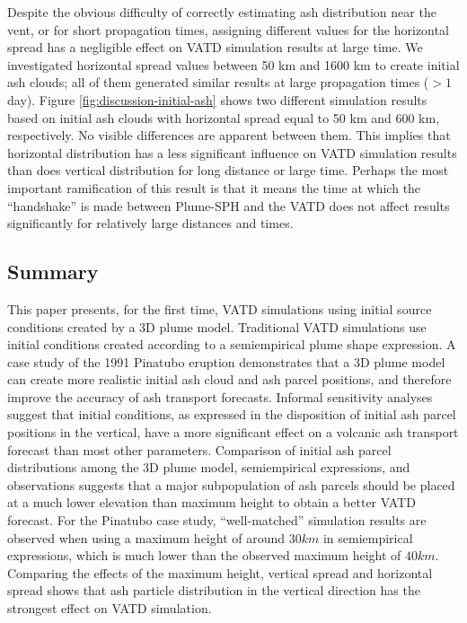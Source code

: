 \documentclass[utf8]{frontiersSCNS} %
\begin{document}
Despite the obvious difficulty of correctly estimating ash distribution near the vent, or for short propagation times, assigning different values for the horizontal spread has a negligible effect on VATD simulation results at large time. We investigated horizontal spread values between 50 km and 1600 km to create initial ash clouds; all of them generated similar results at large propagation times ($> 1$ day). Figure \ref{fig:discussion-initial-ash} shows two different simulation results based on initial ash clouds with horizontal spread equal to 50 km and 600 km, respectively. No visible differences are apparent between them. This implies that horizontal distribution has a less significant influence on VATD simulation results than does vertical distribution for long distance or large time.  Perhaps the most important ramification of this result is that it means the time at which the ``handshake'' is made between Plume-SPH and the VATD does not affect results significantly for relatively large distances and times.

\subsection{Summary}

This paper presents, for the first time, VATD simulations using initial source conditions created by a 3D plume model. Traditional VATD simulations use initial conditions created according to a semiempirical plume shape expression. A case study of the 1991 Pinatubo eruption demonstrates that a 3D plume model can create more realistic initial ash cloud and ash parcel positions, and therefore improve the accuracy of ash transport forecasts. Informal sensitivity analyses suggest that initial conditions, as expressed in the disposition of initial ash parcel positions in the vertical, have a more significant effect on a volcanic ash transport forecast than most other parameters. Comparison of initial ash parcel distributions among the 3D plume model, semiempirical expressions, and observations suggests that a major subpopulation of ash parcels should be placed at a much lower elevation than maximum height to obtain a better VATD forecast. For the Pinatubo case study, ``well-matched'' simulation results are observed when using a maximum height of around $30 km$ in semiempirical expressions, which is much lower than the observed maximum height of $40 km$. Comparing the effects of the maximum height, vertical spread and horizontal spread shows that ash particle distribution in the vertical direction has the strongest effect on VATD simulation.
\end{document}

